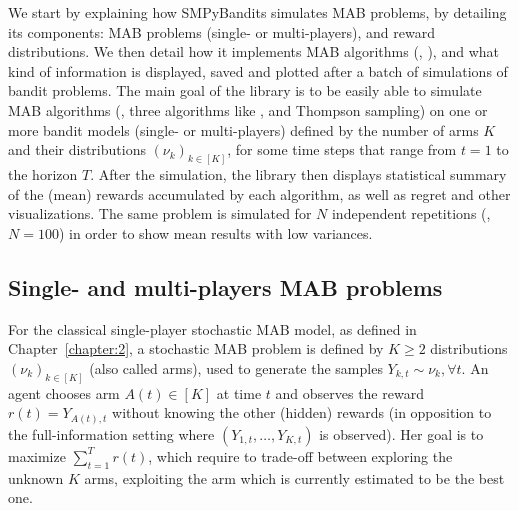 We start by explaining how SMPyBandits simulates MAB problems, by detailing its components:
MAB problems (single- or multi-players),
and reward distributions.
%
We then detail how it implements MAB algorithms (\eg, \UCB),
and what kind of information is displayed, saved and plotted after a batch of simulations of bandit problems.
%
%
The main goal of the library is to be easily able to simulate MAB algorithms (\eg, three algorithms like \UCB, \klUCB{} and Thompson sampling) on one or more bandit models (single- or multi-players) defined by the number of arms $K$ and their distributions $(\nu_k)_{k\in[K]}$, for some time steps that range from $t=1$ to the horizon $T$.
After the simulation, the library then displays statistical summary of the (mean) rewards accumulated by each algorithm, as well as regret and other visualizations.
The same problem is simulated for $N$ independent repetitions (\eg, $N=100$) in order to show mean results with low variances.


\subsection{Single- and multi-players MAB problems}

For the classical single-player stochastic MAB model, as defined in Chapter~\ref{chapter:2},
a stochastic MAB problem is defined by $K \geq 2$ distributions $(\nu_k)_{k\in[K]}$ (also called arms),
used to generate the \iid{} samples $Y_{k,t} \sim \nu_k, \forall t$.
%
An agent chooses arm $A(t)\in[K]$ at time $t$ and observes the reward $r(t) = Y_{A(t),t}$ without knowing the other (hidden) rewards (in opposition to the full-information setting where $(Y_{1,t},\dots,Y_{K,t})$ is observed).
%
Her goal is to maximize $\sum_{t=1}^T r(t)$, which require to trade-off between exploring the unknown $K$ arms, exploiting the arm which is currently estimated to be the best one.

